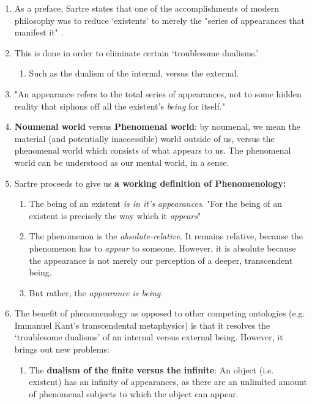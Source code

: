 \begin{enumerate}
  \item As a preface, Sartre states that one of the accomplishments of modern philosophy was to reduce `existents' to merely the "series of appearances that manifest it" \autocite[1]{sartre}.
  \item This is done in order to eliminate certain `troublesome dualisms.'
  \begin{enumerate}
    \item Such as the dualism of the internal, versus the external.
  \end{enumerate}
  \item "An appearance refers to the total series of appearances, not to some hidden reality that siphons off all the existent's \emph{being} for itself." \autocite[2]{sartre}
  \item \textbf{Noumenal world} versus \textbf{Phenomenal world}: by noumenal, we mean the material (and potentially inaccessible) world outside of us, versus the phenomenal world which consists of what appears to us. The phenomenal world can be understood as our mental world, in a sense.
  \item Sartre proceeds to give us \textbf{a working definition of Phenomenology:}
  \begin{enumerate}
    \item The being of an existent \emph{is in it's appearances}. "For the being of an existent is precisely the way which it \emph{appears}" \autocite[2]{sartre}
    \item The phenomenon is the \emph{absolute-relative}. It remains relative, because the phenomenon has to \emph{appear} to someone. However, it is absolute because the appearance is not merely our perception of a deeper, transcendent being.
    \item But rather, the \emph{appearance is being}.
  \end{enumerate}
  \item The benefit of phenomenology as opposed to other competing ontologies (e.g. Immanuel Kant's transcendental metaphysics) is that it resolves the `troublesome dualisms' of an internal versus external being. However, it brings out new problems:
  \begin{enumerate}
    \item The \textbf{dualism of the finite versus the infinite}: An object (i.e. existent) has an infinity of appearances, as there are an unlimited amount of phenomenal subjects to which the object can appear.

\end{enumerate}
\end{enumerate}
